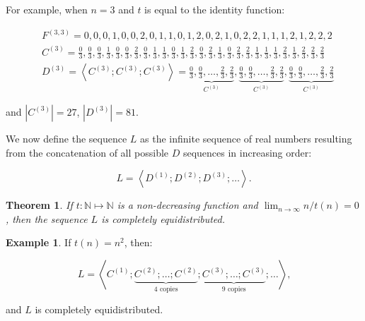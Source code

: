 \documentclass[11pt,a4paper]{tesis}
\theoremstyle{plain}
\newtheorem{theorem}{Theorem}
\theoremstyle{definition}
\newtheorem*{exmp*}{Example}
\begin{document}
For example, when $n = 3$ and $t$ is equal to the identity function:

\begin{equation*}
  \begin{aligned}
    & F^{(3, 3)} = 0, 0, 0, 1, 0, 0, 2, 0, 1, 1, 0, 1, 2, 0, 2, 1, 0, 2, 2, 1, 1, 1, 2, 1, 2, 2, 2 \\
    & C^{(3)} = \frac{0}{3}, \frac{0}{3}, \frac{0}{3}, \frac{1}{3}, \frac{0}{3}, \frac{0}{3}, \frac{2}{3}, \frac{0}{3}, \frac{1}{3}, \frac{1}{3}, \frac{0}{3}, \frac{1}{3}, \frac{2}{3}, \frac{0}{3}, \frac{2}{3}, \frac{1}{3}, \frac{0}{3}, \frac{2}{3}, \frac{2}{3}, \frac{1}{3}, \frac{1}{3}, \frac{1}{3}, \frac{2}{3}, \frac{1}{3}, \frac{2}{3}, \frac{2}{3}, \frac{2}{3} \\
    & D^{(3)} = \left< C^{(3)} ; C^{(3)} ; C^{(3)} \right> = \underbrace{\frac{0}{3}, \frac{0}{3}, \dots, \frac{2}{3}, \frac{2}{3}}_{C^{(3)}}, \underbrace{\frac{0}{3}, \frac{0}{3}, \dots, \frac{2}{3}, \frac{2}{3}}_{C^{(3)}}, \underbrace{\frac{0}{3}, \frac{0}{3}, \dots, \frac{2}{3}, \frac{2}{3}}_{C^{(3)}}
  \end{aligned}
\end{equation*}

and $|C^{(3)}| = 27$, $|D^{(3)}| = 81$.

We now define the sequence $L$ as the infinite sequence of real numbers resulting from the concatenation of all possible $D$ sequences in increasing order:

\begin{equation*}
  L = \left< D^{(1)} ; D^{(2)} ;  D^{(3)} ; \dots \right> \text{.}
\end{equation*}

\begin{theorem}\label{theorem:l-is-completely-equidistributed}
  If $t : \mathbb{N} \mapsto \mathbb{N}$ is a non-decreasing function and $\lim_{n \to \infty} n / t(n) = 0$, then the sequence $L$ is completely equidistributed.
\end{theorem}

\begin{exmp*}
  If $t(n) = n^2$, then:

  \begin{equation*}
    L = \left< C^{(1)} ; \underbrace{C^{(2)} ; \dots ;  C^{(2)}}_{4 \text{ copies}} ;  \underbrace{C^{(3)} ; \dots ;  C^{(3)}}_{9 \text{ copies}} ; \dots \right> \text{,}
  \end{equation*}

  and $L$ is completely equidistributed.
\end{exmp*}
\end{document}
